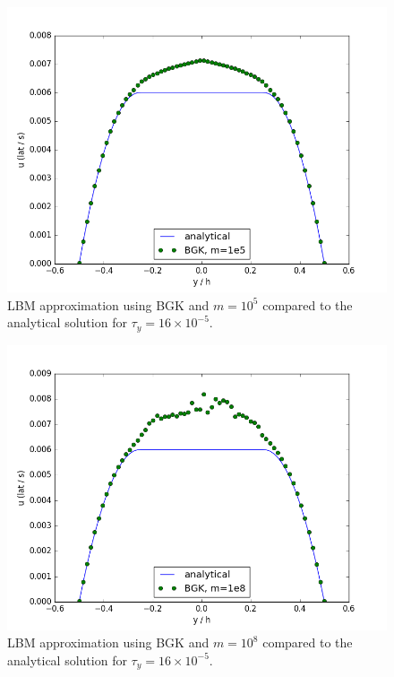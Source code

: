 \documentclass{article}
\begin{document}
\begin{figure}
\includegraphics[width=\textwidth]{figs/poise-bingham/bgk-5/analytical-vs-approx.png}
\caption{LBM approximation using BGK and $m = 10^5$ compared to the analytical solution for $\tau_y = 16 \times 10^{-5}$.}
\label{fig:bing-analyt-bgk-5}
\end{figure}

\begin{figure}
    \includegraphics[width=\textwidth]{figs/poise-bingham/bgk-8/analytical-vs-approx.png}
    \caption{LBM approximation using BGK and $m = 10^8$ compared to the analytical solution for $\tau_y = 16 \times 10^{-5}$.}
\label{fig:bing-analyt-bgk-8}
\end{figure}
\end{document}
